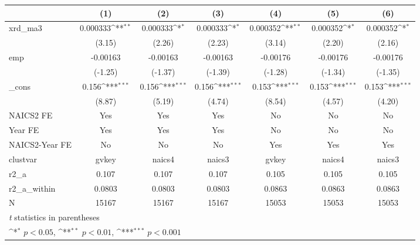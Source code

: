 {
\def\sym#1{\ifmmode^{#1}\else\(^{#1}\)\fi}
\begin{tabular}{l*{6}{c}}
\hline\hline
            &\multicolumn{1}{c}{(1)}         &\multicolumn{1}{c}{(2)}         &\multicolumn{1}{c}{(3)}         &\multicolumn{1}{c}{(4)}         &\multicolumn{1}{c}{(5)}         &\multicolumn{1}{c}{(6)}         \\
\hline
xrd\_ma3     &    0.000333\sym{**} &    0.000333\sym{*}  &    0.000333\sym{*}  &    0.000352\sym{**} &    0.000352\sym{*}  &    0.000352\sym{*}  \\
            &      (3.15)         &      (2.26)         &      (2.23)         &      (3.14)         &      (2.20)         &      (2.16)         \\
[1em]
emp         &    -0.00163         &    -0.00163         &    -0.00163         &    -0.00176         &    -0.00176         &    -0.00176         \\
            &     (-1.25)         &     (-1.37)         &     (-1.39)         &     (-1.28)         &     (-1.34)         &     (-1.35)         \\
[1em]
\_cons      &       0.156\sym{***}&       0.156\sym{***}&       0.156\sym{***}&       0.153\sym{***}&       0.153\sym{***}&       0.153\sym{***}\\
            &      (8.87)         &      (5.19)         &      (4.74)         &      (8.54)         &      (4.57)         &      (4.20)         \\
[1em]
NAICS2 FE   &         Yes         &         Yes         &         Yes         &          No         &          No         &          No         \\
[1em]
Year FE     &         Yes         &         Yes         &         Yes         &          No         &          No         &          No         \\
[1em]
NAICS2-Year FE&          No         &          No         &          No         &         Yes         &         Yes         &         Yes         \\
\hline
clustvar    &       gvkey         &      naics4         &      naics3         &       gvkey         &      naics4         &      naics3         \\
r2\_a        &       0.107         &       0.107         &       0.107         &       0.105         &       0.105         &       0.105         \\
r2\_a\_within &      0.0803         &      0.0803         &      0.0803         &      0.0863         &      0.0863         &      0.0863         \\
N           &       15167         &       15167         &       15167         &       15053         &       15053         &       15053         \\
\hline\hline
\multicolumn{7}{l}{\footnotesize \textit{t} statistics in parentheses}\\
\multicolumn{7}{l}{\footnotesize \sym{*} \(p<0.05\), \sym{**} \(p<0.01\), \sym{***} \(p<0.001\)}\\
\end{tabular}
}
